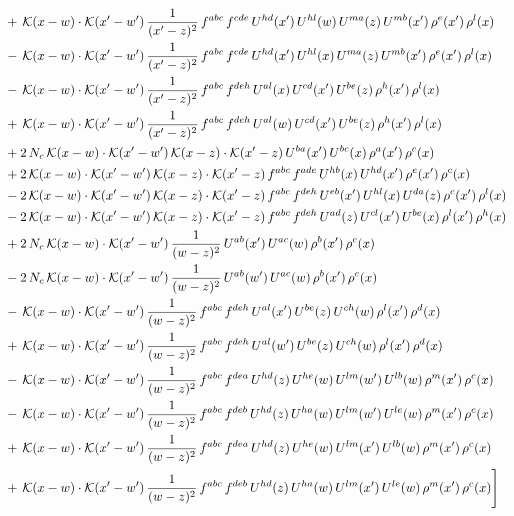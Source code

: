 \documentclass[9pt]{article}
\numberwithin{equation}{section}
\begin{document}
\begin{align}
&+\,\mathcal{K}(x-w)\cdot\mathcal{K}(x'-w')\,\frac{1}{(x'-z)^{2}}\,f^{abc}\,f^{cde}\,U^{hd}(x')\,U^{hl}(w)\,U^{ma}(z)\,U^{mb}(x')\,\rho^{e}(x')\,\rho^{l}(x)\notag\\
&-\,\mathcal{K}(x-w)\cdot\mathcal{K}(x'-w')\,\frac{1}{(x'-z)^{2}}\,f^{abc}\,f^{cde}\,U^{hd}(x')\,U^{hl}(x)\,U^{ma}(z)\,U^{mb}(x')\,\rho^{e}(x')\,\rho^{l}(x)\notag\\
&-\,\mathcal{K}(x-w)\cdot\mathcal{K}(x'-w')\,\frac{1}{(x'-z)^{2}}\,f^{abc}\,f^{deh}\,U^{al}(x)\,U^{cd}(x')\,U^{be}(z)\,\rho^{h}(x')\,\rho^{l}(x)\notag\\
&+\,\mathcal{K}(x-w)\cdot\mathcal{K}(x'-w')\,\frac{1}{(x'-z)^{2}}\,f^{abc}\,f^{deh}\,U^{al}(w)\,U^{cd}(x')\,U^{be}(z)\,\rho^{h}(x')\,\rho^{l}(x)\notag\\
&+2\,N_{c}\,\mathcal{K}(x-w)\cdot\mathcal{K}(x'-w')\,\mathcal{K}(x-z)\cdot\mathcal{K}(x'-z)\,U^{ba}(x')\,U^{bc}(x)\,\rho^{a}(x')\,\rho^{c}(x)\notag\\
&+2\,\mathcal{K}(x-w)\cdot\mathcal{K}(x'-w')\,\mathcal{K}(x-z)\cdot\mathcal{K}(x'-z)\,f^{abc}\,f^{ade}\,U^{hb}(x)\,U^{hd}(x')\,\rho^{e}(x')\,\rho^{c}(x)\notag\\
&-2\,\mathcal{K}(x-w)\cdot\mathcal{K}(x'-w')\,\mathcal{K}(x-z)\cdot\mathcal{K}(x'-z)\,f^{abc}\,f^{deh}\,U^{eb}(x')\,U^{hl}(x)\,U^{da}(z)\,\rho^{c}(x')\,\rho^{l}(x)\notag\\
&-2\,\mathcal{K}(x-w)\cdot\mathcal{K}(x'-w')\,\mathcal{K}(x-z)\cdot\mathcal{K}(x'-z)\,f^{abc}\,f^{deh}\,U^{ad}(z)\,U^{cl}(x')\,U^{be}(x)\,\rho^{l}(x')\,\rho^{h}(x)\notag\\
&+2\,N_{c}\,\mathcal{K}(x-w)\cdot\mathcal{K}(x'-w')\,\frac{1}{(w-z)^{2}}\,U^{ab}(x')\,U^{ac}(w)\,\rho^{b}(x')\,\rho^{c}(x)\notag\\
&-2\,N_{c}\,\mathcal{K}(x-w)\cdot\mathcal{K}(x'-w')\,\frac{1}{(w-z)^{2}}\,U^{ab}(w')\,U^{ac}(w)\,\rho^{b}(x')\,\rho^{c}(x)\notag\\
&-\,\mathcal{K}(x-w)\cdot\mathcal{K}(x'-w')\,\frac{1}{(w-z)^{2}}\,f^{abc}\,f^{deh}\,U^{al}(x')\,U^{be}(z)\,U^{ch}(w)\,\rho^{l}(x')\,\rho^{d}(x)\notag\\
&+\,\mathcal{K}(x-w)\cdot\mathcal{K}(x'-w')\,\frac{1}{(w-z)^{2}}\,f^{abc}\,f^{deh}\,U^{al}(w')\,U^{be}(z)\,U^{ch}(w)\,\rho^{l}(x')\,\rho^{d}(x)\notag\\
&-\,\mathcal{K}(x-w)\cdot\mathcal{K}(x'-w')\,\frac{1}{(w-z)^{2}}\,f^{abc}\,f^{dea}\,U^{hd}(z)\,U^{he}(w)\,U^{lm}(w')\,U^{lb}(w)\,\rho^{m}(x')\,\rho^{c}(x)\notag\\
&-\,\mathcal{K}(x-w)\cdot\mathcal{K}(x'-w')\,\frac{1}{(w-z)^{2}}\,f^{abc}\,f^{deb}\,U^{hd}(z)\,U^{ha}(w)\,U^{lm}(w')\,U^{le}(w)\,\rho^{m}(x')\,\rho^{c}(x)\notag\\
&+\,\mathcal{K}(x-w)\cdot\mathcal{K}(x'-w')\,\frac{1}{(w-z)^{2}}\,f^{abc}\,f^{dea}\,U^{hd}(z)\,U^{he}(w)\,U^{lm}(x')\,U^{lb}(w)\,\rho^{m}(x')\,\rho^{c}(x)\notag\\
&+\,\mathcal{K}(x-w)\cdot\mathcal{K}(x'-w')\,\frac{1}{(w-z)^{2}}\,f^{abc}\,f^{deb}\,U^{hd}(z)\,U^{ha}(w)\,U^{lm}(x')\,U^{le}(w)\,\rho^{m}(x')\,\rho^{c}(x)\Bigg]
\end{align}
\end{document}
